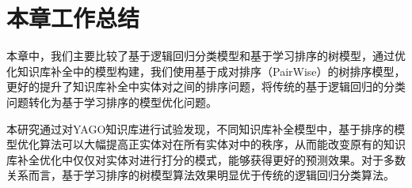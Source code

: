 \section{本章工作总结}
本章中，我们主要比较了基于逻辑回归分类模型和基于学习排序的树模型，通过优化知识库补全中的模型构建，我们使用基于成对排序（PairWise）的树排序模型，更好的提升了知识库补全中实体对之间的排序问题，将传统的基于逻辑回归的分类问题转化为基于学习排序的模型优化问题。

本研究通过对YAGO知识库进行试验发现，不同知识库补全模型中，基于排序的模型优化算法可以大幅提高正实体对在所有实体对中的秩序，从而能改变原有的知识库补全优化中仅仅对实体对进行打分的模式，能够获得更好的预测效果。对于多数关系而言，基于学习排序的树模型算法效果明显优于传统的逻辑回归分类算法。
